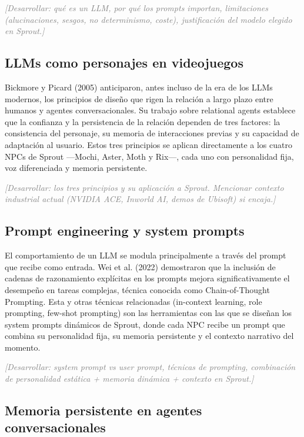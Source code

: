 \documentclass[12pt,twoside,titlepage]{report}
\begin{document}
\textcolor{gray}{\textit{[Desarrollar: qué es un LLM, por qué los prompts importan, limitaciones (alucinaciones, sesgos, no determinismo, coste), justificación del modelo elegido en Sprout.]}}

\subsection{LLMs como personajes en videojuegos}

Bickmore y Picard (2005) anticiparon, antes incluso de la era de los LLMs modernos, los principios de diseño que rigen la relación a largo plazo entre humanos y agentes conversacionales. Su trabajo sobre relational agents establece que la confianza y la persistencia de la relación dependen de tres factores: la consistencia del personaje, su memoria de interacciones previas y su capacidad de adaptación al usuario. Estos tres principios se aplican directamente a los cuatro NPCs de Sprout ---Mochi, Aster, Moth y Rix---, cada uno con personalidad fija, voz diferenciada y memoria persistente.

\textcolor{gray}{\textit{[Desarrollar: los tres principios y su aplicación a Sprout. Mencionar contexto industrial actual (NVIDIA ACE, Inworld AI, demos de Ubisoft) si encaja.]}}

\subsection{Prompt engineering y system prompts}

El comportamiento de un LLM se modula principalmente a través del prompt que recibe como entrada. Wei et al. (2022) demostraron que la inclusión de cadenas de razonamiento explícitas en los prompts mejora significativamente el desempeño en tareas complejas, técnica conocida como Chain-of-Thought Prompting. Esta y otras técnicas relacionadas (in-context learning, role prompting, few-shot prompting) son las herramientas con las que se diseñan los system prompts dinámicos de Sprout, donde cada NPC recibe un prompt que combina su personalidad fija, su memoria persistente y el contexto narrativo del momento.

\textcolor{gray}{\textit{[Desarrollar: system prompt vs user prompt, técnicas de prompting, combinación de personalidad estática + memoria dinámica + contexto en Sprout.]}}

\subsection{Memoria persistente en agentes conversacionales}
\end{document}
